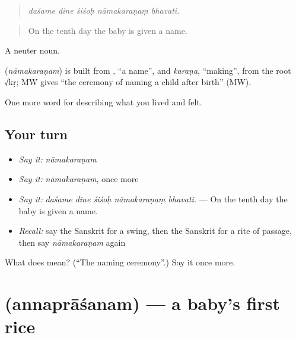 \begin{quote}
    
\end{quote}

\begin{quote}
\emph{daśame dine śiśoḥ nāmakaraṇaṃ bhavati.}
\end{quote}

\begin{quote}
On the tenth day the baby is given a name.
\end{quote}

A neuter noun.

\begin{cousinweb}
\textbf{} (\emph{nāmakaraṇam}) is built from \textbf{}, \textquotedblleft{}a name\textquotedblright{}, and \emph{karaṇa}, \textquotedblleft{}making\textquotedblright{}, from the root √kṛ; MW gives \textquotedblleft{}the ceremony of naming a child after birth\textquotedblright{} (MW).
\end{cousinweb}

\begin{grammarlens}[title={What you've built}]
One more word for describing what you lived and felt.
\end{grammarlens}

\subsection*{Your turn}
\begin{itemize}
\raggedright
  \item \emph{Say it:} \emph{nāmakaraṇam}
  \item \emph{Say it:} \emph{nāmakaraṇam}, once more
  \item \emph{Say it:} \emph{daśame dine śiśoḥ nāmakaraṇaṃ bhavati.} — On the tenth day the baby is given a name.
  \item \emph{Recall:} say the Sanskrit for a swing, then the Sanskrit for a rite of passage, then say \emph{nāmakaraṇam} again
\end{itemize}

\begin{tcolorbox}[breakable,colback=teal!4,colframe=teal!35!black,title={Before you move on}]
What does  mean? (\textquotedblleft{}The naming ceremony\textquotedblright{}.) Say it once more.
\end{tcolorbox}
\section[\texorpdfstring{\sk{अन्नप्राशनम्} (annaprāśanam)}{अन्नप्राशनम् (annaprāśanam)}]{ (annaprāśanam) — a baby's first rice}

